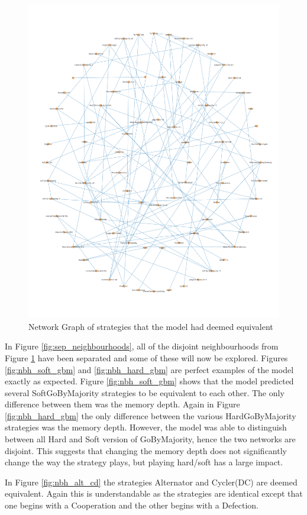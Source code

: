 \begin{figure}[htbp!]
    \centering
    \includegraphics[width=0.8\linewidth]{../img/neighbourhoods/overall.png}
    \caption{Network Graph of strategies that the model had deemed equivalent}
    \label{fig:overall_neighbourhoods}
\end{figure}

In Figure \ref{fig:sep_neighbourhoods}, all of the disjoint neighbourhoods from Figure \ref{fig:overall_neighbourhoods} have been separated  and some of these will now be explored.
Figures \ref{fig:nbh_soft_gbm} and \ref{fig:nbh_hard_gbm} are perfect examples of the model exactly as expected.
Figure \ref{fig:nbh_soft_gbm} shows that the model predicted several SoftGoByMajority strategies to be equivalent to each other.
The only difference between them was the memory depth.
Again in Figure \ref{fig:nbh_hard_gbm} the only difference between the various HardGoByMajority strategies was the memory depth.
However, the model was able to distinguish between all Hard and Soft version of GoByMajority, hence the two networks are disjoint.
This suggests that changing the memory depth does not significantly change the way the strategy plays, but playing hard/soft has a large impact.

In Figure \ref{fig:nbh_alt_cd} the strategies Alternator and Cycler(DC) are deemed equivalent.
Again this is understandable as the strategies are identical except that one begins with a Cooperation and the other begins with a Defection.



